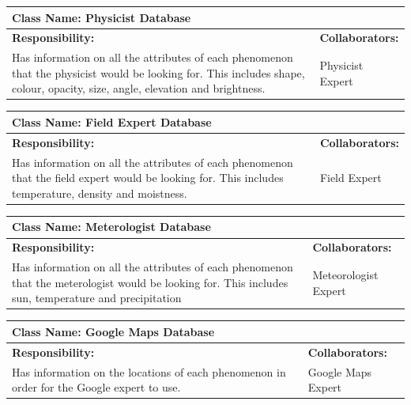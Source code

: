 \documentclass[]{article}
\begin{document}
	\begin{table}[ht]
		\centering
		\begin{tabular}{|p{5cm}|p{5cm}|}
		\hline 
		 \multicolumn{2}{|l|}{\textbf{Class Name: Physicist Database}} \\
		\hline
		\textbf{Responsibility:} & \textbf{Collaborators:} \\
		\hline
		Has information on all the attributes of each phenomenon that the physicist would be looking for. This includes shape, colour, opacity, size, angle, elevation and brightness. \vspace{1in} & Physicist Expert \\
		\hline
		\end{tabular}
	\end{table}
	
	\begin{table}[ht]
		\centering
		\begin{tabular}{|p{5cm}|p{5cm}|}
		\hline 
		 \multicolumn{2}{|l|}{\textbf{Class Name:  Field Expert Database}} \\
		\hline
		\textbf{Responsibility:} & \textbf{Collaborators:} \\
		\hline
		Has information on all the attributes of each phenomenon that the field expert would be looking for. This includes  temperature, density and moistness. \vspace{1in} & Field Expert\\
		\hline
		\end{tabular}
	\end{table}

	\begin{table}[ht]
		\centering
		\begin{tabular}{|p{5cm}|p{5cm}|}
		\hline 
		 \multicolumn{2}{|l|}{\textbf{Class Name: Meterologist Database}} \\
		\hline
		\textbf{Responsibility:} & \textbf{Collaborators:} \\
		\hline
		Has information on all the attributes of each phenomenon that the meterologist would be looking for. This includes  sun, temperature and precipitation \vspace{1in} & Meteorologist Expert\\
		\hline
		\end{tabular}
	\end{table}

	\begin{table}[ht]
		\centering
		\begin{tabular}{|p{5cm}|p{5cm}|}
		\hline 
		 \multicolumn{2}{|l|}{\textbf{Class Name: Google Maps Database}} \\
		\hline
		\textbf{Responsibility:} & \textbf{Collaborators:} \\
		\hline
		Has information on the locations of each phenomenon in order for the Google expert to use. \vspace{1in} & Google Maps Expert\\
		\hline
		\end{tabular}
	\end{table}
\end{document}
